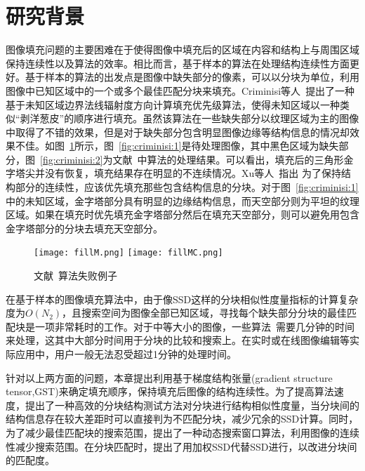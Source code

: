 \section{研究背景}
\label{background}
图像填充问题的主要困难在于使得图像中填充后的区域在内容和结构上与周围区域保持连续性以及算法的效率。相比而言，基于样本的算法在处理结构连续性方面更好。基于样本的算法的出发点是图像中缺失部分的像素，可以以分块为单位，利用图像中已知区域中的一个或多个最佳匹配分块来填充。Criminisi等人~\cite{Criminisi04regionfilling}提出了一种基于未知区域边界法线辐射度方向计算填充优先级算法，使得未知区域以一种类似``剥洋葱皮''的顺序进行填充。虽然该算法在一些缺失部分以纹理区域为主的图像中取得了不错的效果，但是对于缺失部分包含明显图像边缘等结构信息的情况却效果不佳。如图~\ref{fig:criminisi}所示，图~\ref{fig:criminisi:1}是待处理图像，其中黑色区域为缺失部分，图~\ref{fig:criminisi:2}为文献~中算法的处理结果。可以看出，填充后的三角形金字塔尖并没有恢复，填充结果存在明显的不连续情况。Xu等人~\cite{Xu:2010}指出 为了保持结构部分的连续性，应该优先填充那些包含结构信息的分块。对于图~\ref{fig:criminisi:1}中的未知区域，金字塔部分具有明显的边缘结构信息，而天空部分则为平坦的纹理区域。如果在填充时优先填充金字塔部分然后在填充天空部分，则可以避免用包含金字塔部分的分块去填充天空部分。\par
\begin{figure}[htb]
  \centering%
    {\texttt{[image: fillM.png]}}%
 \hspace{1em}%
      {\texttt{[image: fillMC.png]}}
  \caption{文献~算法失败例子}
  \label{fig:criminisi}
\end{figure}
在基于样本的图像填充算法中，由于像SSD这样的分块相似性度量指标的计算复杂度为$O(N_2)$，且搜索空间为图像全部已知区域，寻找每个缺失部分分块的最佳匹配块是一项非常耗时的工作。对于中等大小的图像，一些算法~\cite{Xu:2010}需要几分钟的时间来处理，这其中大部分时间用于分块的比较和搜索上。在实时或在线图像编辑等实际应用中，用户一般无法忍受超过1分钟的处理时间。\par
针对以上两方面的问题，本章提出利用基于梯度结构张量(gradient structure tensor,GST)来确定填充顺序，保持填充后图像的结构连续性。为了提高算法速度，提出了一种高效的分块结构测试方法对分块进行结构相似性度量，当分块间的结构信息存在较大差距时可以直接判为不匹配分块，减少冗余的SSD计算。同时，为了减少最佳匹配块的搜索范围，提出了一种动态搜索窗口算法，利用图像的连续性减少搜索范围。在分块匹配时，提出了用加权SSD代替SSD进行，以改进分块间的匹配度。

